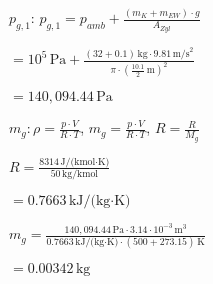 \( p_{g,1} \): \( p_{g,1} = p_{amb} + \frac{(m_K + m_{EW}) \cdot g}{A_{Zyl}} \)  

\( = 10^5 \, \text{Pa} + \frac{(32 + 0.1) \, \text{kg} \cdot 9.81 \, \text{m/s}^2}{\pi \cdot \left( \frac{10.1}{2} \, \text{m} \right)^2} \)  

\( = 140,094.44 \, \text{Pa} \)  

\( m_g: \rho = \frac{p \cdot V}{R \cdot T} \), \( m_g = \frac{p \cdot V}{R \cdot T} \), \( R = \frac{R}{M_g} \)  

\( R = \frac{8314 \, \text{J/(kmol·K)}}{50 \, \text{kg/kmol}} \)  

\( = 0.7663 \, \text{kJ/(kg·K)} \)  

\( m_g = \frac{140,094.44 \, \text{Pa} \cdot 3.14 \cdot 10^{-3} \, \text{m}^3}{0.7663 \, \text{kJ/(kg·K)} \cdot (500 + 273.15) \, \text{K}} \)  

\( = 0.00342 \, \text{kg} \)